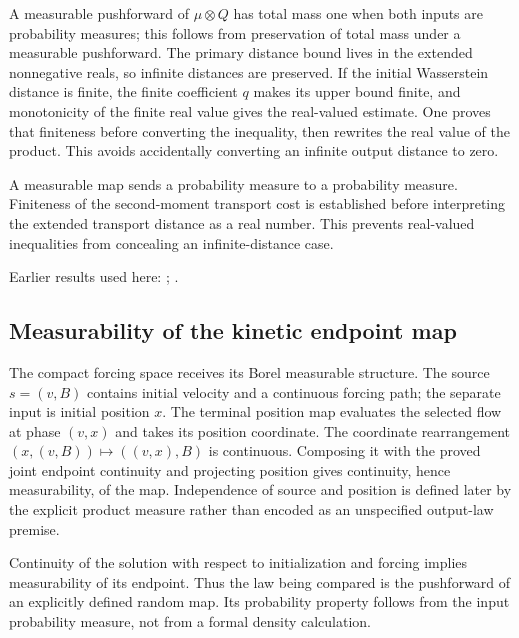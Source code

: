 \documentclass[11pt,a4paper]{report}
\begin{document}
A measurable pushforward of \(\mu\otimes Q\) has total mass one when both inputs are probability measures; this follows from preservation of total mass under a measurable pushforward. The primary distance bound lives in the extended nonnegative reals, so infinite distances are preserved. If the initial Wasserstein distance is finite, the finite coefficient \(q\) makes its upper bound finite, and monotonicity of the finite real value gives the real-valued estimate. One proves that finiteness before converting the inequality, then rewrites the real value of the product. This avoids accidentally converting an infinite output distance to zero.



A measurable map sends a probability measure to a probability measure. Finiteness of the second-moment transport cost is established before interpreting the extended transport distance as a real number. This prevents real-valued inequalities from concealing an infinite-distance case.



Earlier results used here: \cite[Section~3.17.3]{LangevinLean2026ULASC}; \cite[Section~3.17.4]{LangevinLean2026ULASC}.
\subsection{\texorpdfstring{Measurability of the kinetic endpoint map}{Measurability of the kinetic endpoint map}}
\label{report-step-KineticLangevin-FlowLaw-lean-4}


The compact forcing space receives its Borel measurable structure. The source \(s=(v,B)\) contains initial velocity and a continuous forcing path; the separate input is initial position \(x\). The terminal position map evaluates the selected flow at phase \((v,x)\) and takes its position coordinate. The coordinate rearrangement \((x,(v,B))\mapsto((v,x),B)\) is continuous. Composing it with the proved joint endpoint continuity and projecting position gives continuity, hence measurability, of the map. Independence of source and position is defined later by the explicit product measure rather than encoded as an unspecified output-law premise.



Continuity of the solution with respect to initialization and forcing implies measurability of its endpoint. Thus the law being compared is the pushforward of an explicitly defined random map. Its probability property follows from the input probability measure, not from a formal density calculation.
\end{document}
